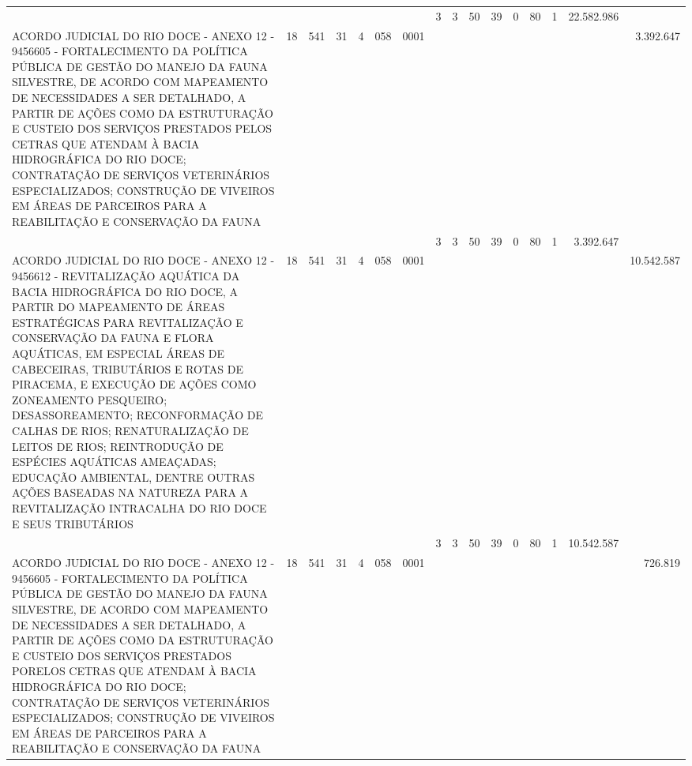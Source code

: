 \documentclass{article}
\begin{document}
\begin{longtable}[c]{m{6.5cm}|m{1pt}m{1pt}m{1pt}m{1pt}m{1pt}m{1pt}|m{1pt}m{1pt}m{0.5pt}m{1pt}|m{1pt}|m{1pt}m{1pt}|m{1pt}|m{2pt}}
& & & & & & & \multicolumn{1}{c}{ 3 } & \multicolumn{1}{c}{ 3 } & \multicolumn{1}{c}{ 50 } & \multicolumn{1}{c|}{ 39 } & \multicolumn{1}{c|}{ 0 } & \multicolumn{1}{l}{ 80 } & \multicolumn{1}{c|}{ 1 } & \multicolumn{1}{r|}{ 22.582.986 } & \\
\multicolumn{1}{L{5.5cm}|}{ ACORDO JUDICIAL DO RIO DOCE - ANEXO 12 - 9456605 - FORTALECIMENTO DA POLÍTICA PÚBLICA DE GESTÃO DO MANEJO DA FAUNA SILVESTRE, DE ACORDO COM MAPEAMENTO DE NECESSIDADES A SER DETALHADO, A PARTIR DE AÇÕES COMO DA ESTRUTURAÇÃO E CUSTEIO DOS SERVIÇOS PRESTADOS PELOS CETRAS QUE ATENDAM À BACIA HIDROGRÁFICA DO RIO DOCE; CONTRATAÇÃO DE SERVIÇOS VETERINÁRIOS ESPECIALIZADOS; CONSTRUÇÃO DE VIVEIROS EM ÁREAS DE PARCEIROS PARA A REABILITAÇÃO E CONSERVAÇÃO DA FAUNA } & \multicolumn{1}{c}{ 18 } & \multicolumn{1}{c}{ 541 } & \multicolumn{1}{c}{ 31 } & \multicolumn{1}{l}{ 4 } & \multicolumn{1}{c}{ 058 } & \multicolumn{1}{l|}{ 0001 } & & & & & & & & & \multicolumn{1}{r}{ 3.392.647 } \\
& & & & & & & \multicolumn{1}{c}{ 3 } & \multicolumn{1}{c}{ 3 } & \multicolumn{1}{c}{ 50 } & \multicolumn{1}{c|}{ 39 } & \multicolumn{1}{c|}{ 0 } & \multicolumn{1}{l}{ 80 } & \multicolumn{1}{c|}{ 1 } & \multicolumn{1}{r|}{ 3.392.647 } & \\
\multicolumn{1}{L{5.5cm}|}{ ACORDO JUDICIAL DO RIO DOCE - ANEXO 12 - 9456612 - REVITALIZAÇÃO AQUÁTICA DA BACIA HIDROGRÁFICA DO RIO DOCE, A PARTIR DO MAPEAMENTO DE ÁREAS ESTRATÉGICAS PARA REVITALIZAÇÃO E CONSERVAÇÃO DA FAUNA E FLORA AQUÁTICAS, EM ESPECIAL ÁREAS DE CABECEIRAS, TRIBUTÁRIOS E ROTAS DE PIRACEMA, E EXECUÇÃO DE AÇÕES COMO ZONEAMENTO PESQUEIRO; DESASSOREAMENTO; RECONFORMAÇÃO DE CALHAS DE RIOS; RENATURALIZAÇÃO DE LEITOS DE RIOS; REINTRODUÇÃO DE ESPÉCIES AQUÁTICAS AMEAÇADAS; EDUCAÇÃO AMBIENTAL, DENTRE OUTRAS AÇÕES BASEADAS NA NATUREZA PARA A REVITALIZAÇÃO INTRACALHA DO RIO DOCE E SEUS TRIBUTÁRIOS } & \multicolumn{1}{c}{ 18 } & \multicolumn{1}{c}{ 541 } & \multicolumn{1}{c}{ 31 } & \multicolumn{1}{l}{ 4 } & \multicolumn{1}{c}{ 058 } & \multicolumn{1}{l|}{ 0001 } & & & & & & & & & \multicolumn{1}{r}{ 10.542.587 } \\
& & & & & & & \multicolumn{1}{c}{ 3 } & \multicolumn{1}{c}{ 3 } & \multicolumn{1}{c}{ 50 } & \multicolumn{1}{c|}{ 39 } & \multicolumn{1}{c|}{ 0 } & \multicolumn{1}{l}{ 80 } & \multicolumn{1}{c|}{ 1 } & \multicolumn{1}{r|}{ 10.542.587 } & \\
\multicolumn{1}{L{5.5cm}|}{ ACORDO JUDICIAL DO RIO DOCE - ANEXO 12 - 9456605 - FORTALECIMENTO DA POLÍTICA PÚBLICA DE GESTÃO DO MANEJO DA FAUNA SILVESTRE, DE ACORDO COM MAPEAMENTO DE NECESSIDADES A SER DETALHADO, A PARTIR DE AÇÕES COMO DA ESTRUTURAÇÃO E CUSTEIO DOS SERVIÇOS PRESTADOS PORELOS CETRAS QUE ATENDAM À BACIA HIDROGRÁFICA DO RIO DOCE; CONTRATAÇÃO DE SERVIÇOS VETERINÁRIOS ESPECIALIZADOS; CONSTRUÇÃO DE VIVEIROS EM ÁREAS DE PARCEIROS PARA A REABILITAÇÃO E CONSERVAÇÃO DA FAUNA } & \multicolumn{1}{c}{ 18 } & \multicolumn{1}{c}{ 541 } & \multicolumn{1}{c}{ 31 } & \multicolumn{1}{l}{ 4 } & \multicolumn{1}{c}{ 058 } & \multicolumn{1}{l|}{ 0001 } & & & & & & & & & \multicolumn{1}{r}{ 726.819 } \\

\end{longtable}
\end{document}
